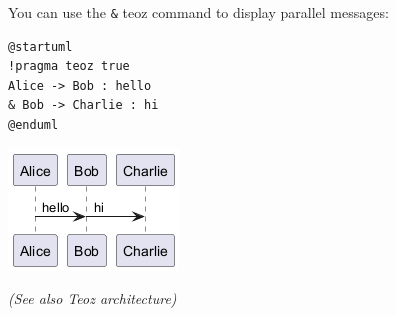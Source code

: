 You can use the \texttt{\&} teoz command to display parallel messages:


\begin{verbatim}
@startuml
!pragma teoz true
Alice -> Bob : hello
& Bob -> Charlie : hi
@enduml
\end{verbatim}
\begin{center}
\includegraphics[scale=0.60]{imgw/img-7afe35deb2c3bad3cc064d53e7c264e8.png}
\end{center}


\textit{(See also Teoz architecture)}

